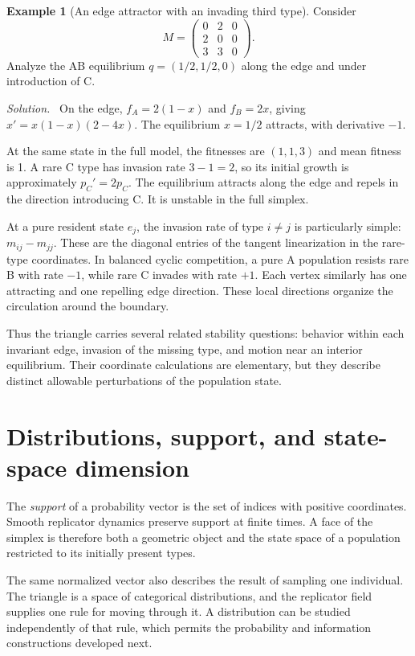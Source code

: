 \documentclass[11pt,oneside,openany]{book}
\theoremstyle{definition}
\newtheorem{example}{Example}[chapter]
\theoremstyle{remark}
\newenvironment{solution}{\par\smallskip\noindent\textit{Solution.}\ }{\par\smallskip}
\numberwithin{equation}{chapter}
\begin{document}
\begin{example}[An edge attractor with an invading third type]
Consider
\[
M=\begin{pmatrix}0&2&0\\2&0&0\\3&3&0\end{pmatrix}.
\]
Analyze the AB equilibrium $q=(1/2,1/2,0)$ along the edge and under introduction of C.
\begin{solution}
On the edge, $f_A=2(1-x)$ and $f_B=2x$, giving $x'=x(1-x)(2-4x)$. The equilibrium $x=1/2$ attracts, with derivative $-1$.

At the same state in the full model, the fitnesses are $(1,1,3)$ and mean fitness is 1. A rare C type has invasion rate $3-1=2$, so its initial growth is approximately $p_C'=2p_C$. The equilibrium attracts along the edge and repels in the direction introducing C. It is unstable in the full simplex.
\end{solution}
\end{example}

At a pure resident state $e_j$, the invasion rate of type $i\ne j$ is particularly simple: $m_{ij}-m_{jj}$. These are the diagonal entries of the tangent linearization in the rare-type coordinates. In balanced cyclic competition, a pure A population resists rare B with rate $-1$, while rare C invades with rate $+1$. Each vertex similarly has one attracting and one repelling edge direction. These local directions organize the circulation around the boundary.

Thus the triangle carries several related stability questions: behavior within each invariant edge, invasion of the missing type, and motion near an interior equilibrium. Their coordinate calculations are elementary, but they describe distinct allowable perturbations of the population state.

\section{Distributions, support, and state-space dimension}
The \emph{support} of a probability vector is the set of indices with positive coordinates. Smooth replicator dynamics preserve support at finite times. A face of the simplex is therefore both a geometric object and the state space of a population restricted to its initially present types.

The same normalized vector also describes the result of sampling one individual. The triangle is a space of categorical distributions, and the replicator field supplies one rule for moving through it. A distribution can be studied independently of that rule, which permits the probability and information constructions developed next.
\end{document}
